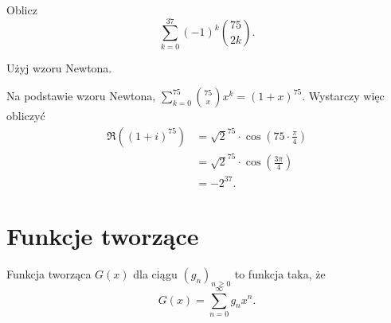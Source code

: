 \documentclass{scrartcl}
\begin{document}
    \begin{problem}
        Oblicz
        $$ \sum_{k = 0}^{37} (-1)^k\binom{75}{2k}. $$
        \begin{hint}
            Użyj wzoru Newtona.
        \end{hint}
        \begin{answer}
            Na podstawie wzoru Newtona, $\sum_{k = 0}^{75}\binom{75}{x}x^k = (1 + x)^{75}$. Wystarczy więc obliczyć
            \begin{align*}
                \Re\left((1 + i)^{75}\right) &= \sqrt{2}^{75} \cdot \cos\left(75\cdot\frac{\pi}{4}\right) \\
                                              &= \sqrt{2}^{75} \cdot \cos\left(\frac{3\pi}{4}\right) \\
                                              &= -2^{37}.
            \end{align*}
        \end{answer}
    \end{problem}

\section{Funkcje tworzące}
    \begin{definition}
        Funkcja tworząca $G(x)$ dla ciągu $(g_n)_{n\geq 0}$ to funkcja taka, że
        $$ G(x) = \sum_{n = 0}^\infty g_nx^n. $$
    \end{definition}
\end{document}
